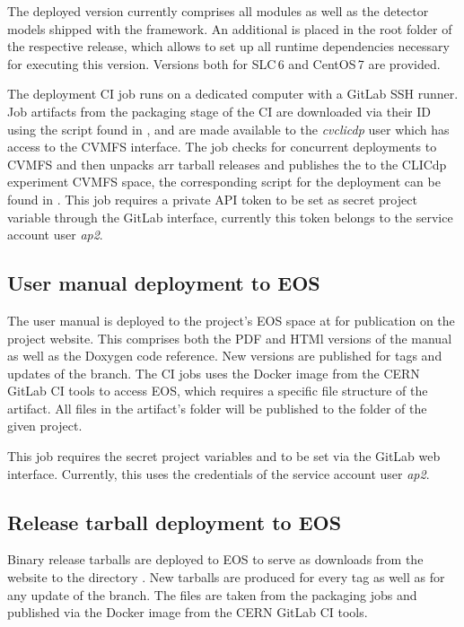 The deployed version currently comprises all modules as well as the detector models shipped with the framework.
An additional  is placed in the root folder of the respective release, which allows to set up all runtime dependencies necessary for executing this version.
Versions both for SLC\,6 and CentOS\,7 are provided.

The deployment CI job runs on a dedicated computer with a GitLab SSH runner.
Job artifacts from the packaging stage of the CI are downloaded via their ID using the script found in , and are made available to the \emph{cvclicdp} user which has access to the CVMFS interface.
The job checks for concurrent deployments to CVMFS and then unpacks arr tarball releases and publishes the to the CLICdp experiment CVMFS space, the corresponding script for the deployment can be found in .
This job requires a private API token to be set as secret project variable through the GitLab interface, currently this token belongs to the service account user \emph{ap2}.

\subsection{User manual deployment to EOS}

The user manual is deployed to the project's EOS space at  for publication on the project website.
This comprises both the PDF and HTMl versions of the manual as well as the Doxygen code reference.
New versions are published for tags and updates of the  branch.
The CI jobs uses the  Docker image from the CERN GitLab CI tools to access EOS, which requires a specific file structure of the artifact.
All files in the artifact's  folder will be published to the  folder of the given project.

This job requires the secret project variables  and  to be set via the GitLab web interface.
Currently, this uses the credentials of the service account user \emph{ap2}.

\subsection{Release tarball deployment to EOS}

Binary release tarballs are deployed to EOS to serve as downloads from the website to the directory .
New tarballs are produced for every tag as well as for any update of the  branch.
The files are taken from the packaging jobs and published via the  Docker image from the CERN GitLab CI tools.

